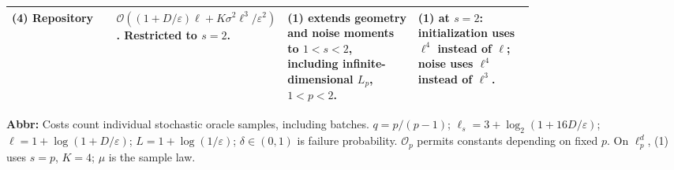 \begin{table}[tp]
\begin{threeparttable}
\begin{tabularx}{\linewidth}{@{}>{\raggedright\arraybackslash}p{0.20\linewidth}>{\raggedright\arraybackslash}p{0.32\linewidth}>{\raggedright\arraybackslash}p{0.25\linewidth}>{\raggedright\arraybackslash}X@{}}
\midrule
\textbf{(4)} Repository \citep{psRepositoryKm} & $\mathcal{O}((1+D/\varepsilon)\ell+K\sigma^2\ell^3/\varepsilon^2)$. Restricted to $s=2$. & \textbf{(1)} extends geometry and noise moments to $1<s<2$, including infinite-dimensional $L_p$, $1<p<2$. & \textbf{(1)} at $s=2$: initialization uses $\ell^4$ instead of $\ell$; noise uses $\ell^4$ instead of $\ell^3$. \\
\bottomrule
\end{tabularx}
\begin{tablenotes}[flushleft]\footnotesize
\item[] \textbf{Abbr:} Costs count individual stochastic oracle samples, including batches. $q=p/(p-1)$; $\ell_s=3+\log_2(1+16D/\varepsilon)$; $\ell=1+\log(1+D/\varepsilon)$; $L=1+\log(1/\varepsilon)$; $\delta\in(0,1)$ is failure probability. $\mathcal{O}_p$ permits constants depending on fixed $p$. On $\ell_p^d$, (1) uses $s=p$, $K=4$; $\mu$ is the sample law.
\end{tablenotes}
\end{threeparttable}
\end{table}
\clearpage
